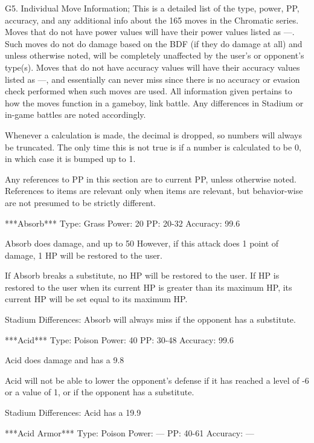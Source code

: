 \documentclass[reprint, aps, prl, paper=A4]{revtex4-1}
\begin{document}
G5. Individual Move Information;
This is a detailed list of the type, power, PP, accuracy, and any additional info about the 165
moves in the Chromatic series. Moves that do not have power values will have their power values
listed as ---. Such moves do not do damage based on the BDF (if they do damage at all) and
unless otherwise noted, will be completely unaffected by the user's or opponent's type(s).
Moves that do not have accuracy values will have their accuracy values listed as ---, and
essentially can never miss since there is no accuracy or evasion check performed when such
moves are used. All information given pertains to how the moves function in a gameboy, link
battle. Any differences in Stadium or in-game battles are noted accordingly.

Whenever a calculation is made, the decimal is dropped, so numbers will always be truncated.
The only time this is not true is if a number is calculated to be 0, in which case it is bumped
up to 1.

Any references to PP in this section are to current PP, unless otherwise noted. References to
items are relevant only when items are relevant, but behavior-wise are not presumed to be
strictly different.


***Absorb***
Type: Grass
Power: 20
PP: 20-32
Accuracy: 99.6%

Absorb does damage, and up to 50%
However, if this attack does 1 point of damage, 1 HP will be restored to the user.

If Absorb breaks a substitute, no HP will be restored to the user. If HP is restored to the
user when its current HP is greater than its maximum HP, its current HP will be set equal to
its maximum HP.

Stadium Differences:
Absorb will always miss if the opponent has a substitute.


***Acid***
Type: Poison
Power: 40
PP: 30-48
Accuracy: 99.6%

Acid does damage and has a 9.8%

Acid will not be able to lower the opponent's defense if it has reached a level of -6 or a
value of 1, or if the opponent has a substitute.

Stadium Differences:
Acid has a 19.9%


***Acid Armor***
Type: Poison
Power: ---
PP: 40-61
Accuracy: ---
\end{document}
